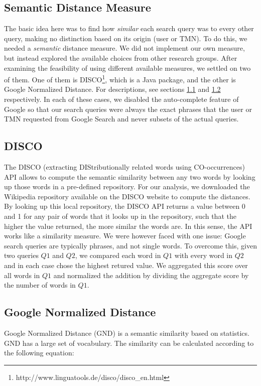 \documentclass[11pt]{article}
\begin{document}
\begin{multicols}{2}
\section{Semantic Distance Measure}
The basic idea here was to find how \textit{similar} each search query was to every other query, making no distinction based on its origin (user or TMN). To do this, we needed a \textit{semantic} distance measure. We did not implement our own measure, but instead explored the available choices from other research groups. After examining the feasibility of using different available measures, we settled on two of them. One of them is DISCO\footnote{http://www.linguatools.de/disco/disco\_en.html}, which is a Java package, and the other is Google Normalized Distance. For descriptions, see sections \ref{sec:disco} and \ref{sec:gnd} respectively. In each of these cases, we disabled the auto-complete feature of Google so that our search queries were always the exact phrases that the user or TMN requested from Google Search and never subsets of the actual queries.

\subsection{DISCO}
\label{sec:disco}
The DISCO (extracting DIStributionally related words using CO-occurrences) API allows to compute the semantic similarity between any two words by looking up those words in a pre-defined repository. For our analysis, we downloaded the Wikipedia repository available on the DISCO website to compute the distances. By looking up this local repository, the DISCO API returns a value between 0 and 1 for any pair of words that it looks up in the repository, such that the higher the value returned, the more similar the words are. In this sense, the API works like a similarity measure. We were however faced with one issue: Google search queries are typically phrases, and not single words. To overcome this, given two queries $Q1$ and $Q2$, we compared each word in $Q1$ with every word in $Q2$ and in each case chose the highest retured value. We aggregated this score over all words in $Q1$ and normalized the addition by dividing the aggregate score by the number of words in $Q1$.

\subsection{Google Normalized Distance}
\label{sec:gnd}
Google Normalized Distance (GND) is a semantic similarity based on statistics. GND has a large set of vocabulary. The similarity can be calculated according to the following equation:


\end{multicols}
\end{document}
